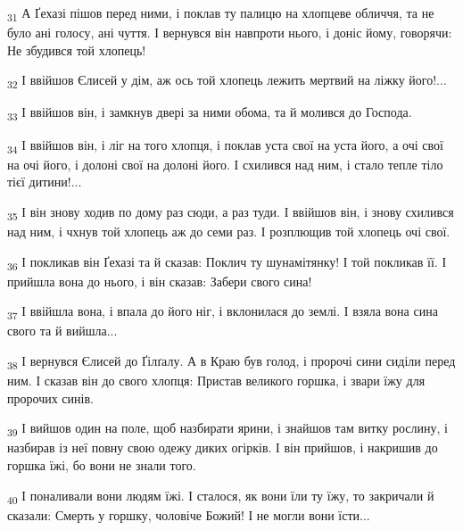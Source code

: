\begin{tcolorbox}
\textsubscript{31} А Ґехазі пішов перед ними, і поклав ту палицю на хлопцеве обличчя, та не було ані голосу, ані чуття. І вернувся він навпроти нього, і доніс йому, говорячи: Не збудився той хлопець!
\end{tcolorbox}
\begin{tcolorbox}
\textsubscript{32} І ввійшов Єлисей у дім, аж ось той хлопець лежить мертвий на ліжку його!...
\end{tcolorbox}
\begin{tcolorbox}
\textsubscript{33} І ввійшов він, і замкнув двері за ними обома, та й молився до Господа.
\end{tcolorbox}
\begin{tcolorbox}
\textsubscript{34} І ввійшов він, і ліг на того хлопця, і поклав уста свої на уста його, а очі свої на очі його, і долоні свої на долоні його. І схилився над ним, і стало тепле тіло тієї дитини!...
\end{tcolorbox}
\begin{tcolorbox}
\textsubscript{35} І він знову ходив по дому раз сюди, а раз туди. І ввійшов він, і знову схилився над ним, і чхнув той хлопець аж до семи раз. І розплющив той хлопець очі свої.
\end{tcolorbox}
\begin{tcolorbox}
\textsubscript{36} І покликав він Ґехазі та й сказав: Поклич ту шунамітянку! І той покликав її. І прийшла вона до нього, і він сказав: Забери свого сина!
\end{tcolorbox}
\begin{tcolorbox}
\textsubscript{37} І ввійшла вона, і впала до його ніг, і вклонилася до землі. І взяла вона сина свого та й вийшла...
\end{tcolorbox}
\begin{tcolorbox}
\textsubscript{38} І вернувся Єлисей до Ґілґалу. А в Краю був голод, і пророчі сини сиділи перед ним. І сказав він до свого хлопця: Пристав великого горшка, і звари їжу для пророчих синів.
\end{tcolorbox}
\begin{tcolorbox}
\textsubscript{39} І вийшов один на поле, щоб назбирати ярини, і знайшов там витку рослину, і назбирав із неї повну свою одежу диких огірків. І він прийшов, і накришив до горшка їжі, бо вони не знали того.
\end{tcolorbox}
\begin{tcolorbox}
\textsubscript{40} І поналивали вони людям їжі. І сталося, як вони їли ту їжу, то закричали й сказали: Смерть у горшку, чоловіче Божий! І не могли вони їсти...
\end{tcolorbox}
